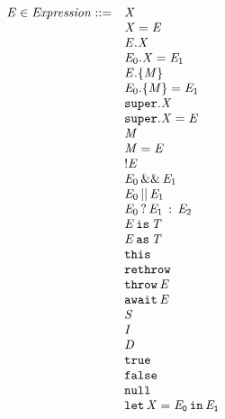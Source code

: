 \documentclass{article}
\begin{document}
\newcommand{\AwaitExpression}[1]{\tt{await\,#1}}


\newcommand{\StringLiteral}[1]{#1}
\newcommand{\IntLiteral}[1]{#1}
\newcommand{\DoubleLiteral}[1]{#1}
\newcommand{\BoolLiteral}[1]{#1}
\newcommand{\NullLiteral}{\tt{null}}
\newcommand{\Let}[3]{\tt{let}\,#1=#2\,\tt{in}\,#3}


\[
\begin{array}{rl}
  \expressionmeta \in \mathit{Expression} ::=
  & \VariableGet{\variablemeta} \\
  & \VariableSet{\variablemeta}{\expressionmeta} \\
  & \PropertyGet{\expressionmeta}{\idmeta} \\
  & \PropertySet{\expressionmeta_0}{\idmeta}{\expressionmeta_1} \\
  & \DirectPropertyGet{\expressionmeta}{\membermeta} \\
  & \DirectPropertySet{\expressionmeta_0}{\membermeta}{\expressionmeta_1} \\
  & \SuperPropertyGet{\idmeta} \\
  & \SuperPropertySet{\idmeta}{\expressionmeta} \\
  & \StaticGet{\membermeta} \\
  & \StaticSet{\membermeta}{\expressionmeta} \\
  & \Not{\expressionmeta} \\
  & \AndExpression{\expressionmeta_0}{\expressionmeta_1} \\
  & \OrExpression{\expressionmeta_0}{\expressionmeta_1} \\
  & \ConditionalExpression{\expressionmeta_0}{\expressionmeta_1}{\expressionmeta_2} \\
  & \IsExpression{\expressionmeta}{\typemeta} \\
  & \AsExpression{\expressionmeta}{\typemeta} \\
  & \ThisExpression \\
  & \Rethrow \\
  & \Throw{\expressionmeta} \\
  & \AwaitExpression{\expressionmeta} \\
  & \StringLiteral{\stringmeta} \\
  & \IntLiteral{\integermeta} \\
  & \DoubleLiteral{\doublemeta} \\
  & \BoolLiteral{\tt{true}} \\
  & \BoolLiteral{\tt{false}} \\
  & \NullLiteral \\
  & \Let{\variablemeta}{\expressionmeta_0}{\expressionmeta_1} \\
\end{array}  
\]
\end{document}
